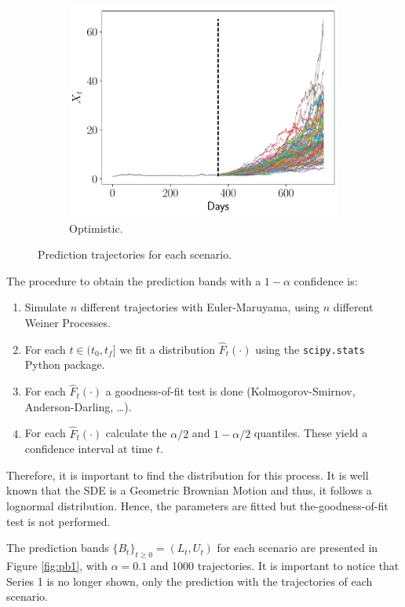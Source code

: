 \documentclass[11pt]{article}
\theoremstyle{definition}
\theoremstyle{remark}
\theoremstyle{remark}
\begin{document}
\begin{figure}[t]
\begin{subfigure}[b]{0.45\textwidth}
      \includegraphics[scale=0.45]{pronostico-optimista.pdf}
      \caption{Optimistic.}
  \end{subfigure}
  \caption{Prediction trajectories for each scenario.}
  \label{fig:trajectories1}
\end{figure}

The procedure to obtain the prediction bands with a $1 - \alpha$
confidence is:
\begin{enumerate}
\item Simulate $n$ different trajectories with Euler-Maruyama, using
  $n$ different Weiner Processes.
\item For each $t \in (t_0, t_f]$ we fit a distribution
  $\hat{F}_t(\cdot)$ using the \texttt{scipy.stats} Python package.
\item For each $\hat{F}_t(\cdot)$ a goodness-of-fit test is done
  (Kolmogorov-Smirnov, Anderson-Darling, \dots).
\item For each $\hat{F}_t(\cdot)$ calculate the $\alpha / 2$ and
  $1 - \alpha/2$ quantiles. These yield a confidence interval at
  time $t$.
\end{enumerate}

Therefore, it is important to find the distribution for this
process. It is well known that the SDE is a Geometric Brownian Motion
and thus, it follows a lognormal distribution. Hence, the parameters
are fitted but the-goodness-of-fit test is not performed.

The prediction bands $\{B_t\}_{t \ge 0 }=\left(L_t, U_t\right)$
for each scenario are presented in Figure \ref{fig:pb1}, with
$\alpha=0.1$ and 1000 trajectories. It is important to notice that
Series 1 is no longer shown, only the prediction with the trajectories
of each scenario.
\end{document}
